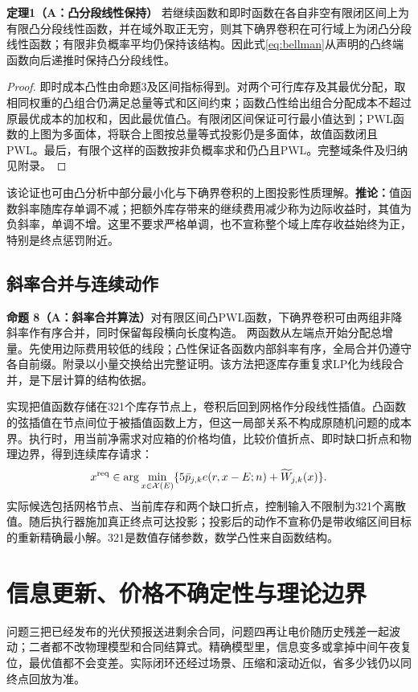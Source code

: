 \documentclass[UTF8,a4paper,zihao=-4,fontset=mac]{ctexart}
\newcommand{\pp}[2]{\par\ifdim\dimexpr\pagegoal-\pagetotal\relax<5\baselineskip\newpage\fi\noindent\textbf{命题 #1（#2）}\quad}
\begin{document}
\noindent\textbf{定理1（A：凸分段线性保持）}\quad
若继续函数和即时函数在各自非空有限闭区间上为有限凸分段线性函数，并在域外取正无穷，则其下确界卷积在可行域上为闭凸分段线性函数；有限非负概率平均仍保持该结构。因此式\eqref{eq:bellman}从声明的凸终端函数向后递推时保持凸分段线性。
\begin{proof}
即时成本凸性由命题3及区间指标得到。对两个可行库存及其最优分配，取相同权重的凸组合仍满足总量等式和区间约束；函数凸性给出组合分配成本不超过原最优成本的加权和，因此最优值凸。有限闭区间保证可行最小值达到；PWL函数的上图为多面体，将联合上图按总量等式投影仍是多面体，故值函数闭且PWL。最后，有限个这样的函数按非负概率求和仍凸且PWL。完整域条件及归纳见附录。
\end{proof}
该论证也可由凸分析中部分最小化与下确界卷积的上图投影性质理解\cite{rockafellar,boyd}。\textbf{推论：}值函数斜率随库存单调不减；把额外库存带来的继续费用减少称为边际收益时，其值为负斜率，单调不增。这里不要求严格单调，也不宣称整个域上库存收益始终为正，特别是终点惩罚附近。

\subsection{斜率合并与连续动作}
\pp{8}{A：斜率合并算法}对有限区间凸PWL函数，下确界卷积可由两组非降斜率作有序合并，同时保留每段横向长度构造。
两函数从左端点开始分配总增量。先使用边际费用较低的线段；凸性保证各函数内部斜率有序，全局合并仍遵守各自前缀。附录以小量交换给出完整证明。该方法把逐库存重复求LP化为线段合并，是下层计算的结构依据。

实现把值函数存储在321个库存节点上，卷积后回到网格作分段线性插值。凸函数的弦插值在节点间位于被插值函数上方，但这一局部关系不构成原随机问题的成本界。执行时，用当前净需求对应箱的价格均值，比较价值折点、即时缺口折点和物理边界，得到连续库存请求：
\begin{equation}\label{eq:action}
 x^{\rm req}\in\arg\min_{x\in\mathcal X(E)}
 \{5\bar p_{j,k}e(r,x-E;n)+\widetilde W_{j,k}(x)\}.
\end{equation}
实际候选包括网格节点、当前库存和两个缺口折点，控制输入不限制为321个离散值。随后执行器施加真正终点可达投影；投影后的动作不宣称仍是带收缩区间目标的重新精确最小解。321是数值存储参数，数学凸性来自函数结构。

\section{信息更新、价格不确定性与理论边界}
问题三把已经发布的光伏预报送进剩余合同，问题四再让电价随历史残差一起波动；二者都不改物理模型和合同结算式。精确模型里，信息变多或拿掉中间午夜复位，最优值都不会变差。实际闭环还经过场景、压缩和滚动近似，省多少钱仍以同终点回放为准。
\end{document}
